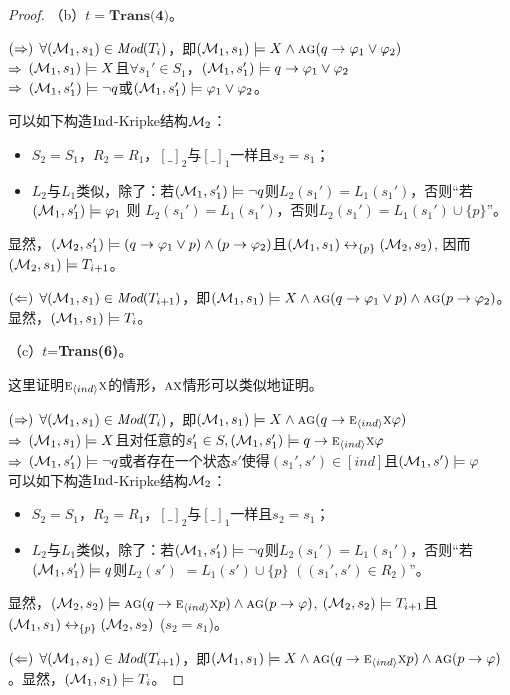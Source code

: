 \begin{proof}
	（b）$t=\textbf{Trans(4)}$。
	
	$(\Rightarrow)$	$\forall({\cal M}_1,s_1) \in \textit{Mod}(T_i)$，即$({\cal M}_1,s_1) \models X \wedge \textsc{a}\textsc{g} (q \rightarrow \varphi_1 \vee \varphi_2)$ \\
	$\Rightarrow$ $({\cal M}_1,s_1) \models X$且$\forall s_1'\in S_1$，$({\cal M}_1, s_1') \models q \rightarrow \varphi_1 \vee \varphi_2$\\
	$\Rightarrow$ $({\cal M}_1,s_1')\models \neg q$或$({\cal M}_1,s_1')\models \varphi_1 \vee \varphi_2$。
	
	可以如下构造$\textrm{Ind}$-Kripke结构${\cal M}_2$：
	\begin{itemize}
		\item $S_2=S_1$，$R_2=R_1$，$[\_]_2$与$[\_]_1$一样且$s_2=s_1$；
		\item $L_2$与$L_1$类似，除了：若$({\cal M}_1, s_1') \models \neg q$则$L_2(s_1') = L_1(s_1')$，否则“若$({\cal M}_1,s_1') \models \varphi_1$ 则 $L_2(s_1')=L_1(s_1')$，否则$L_2(s_1')=L_1(s_1') \cup \{p\}$”。
	\end{itemize}
	显然，$({\cal M}_2,s_1') \models (q\rightarrow \varphi_1 \vee p) \wedge (p \rightarrow \varphi_2)$且$({\cal M}_1, s_1) \leftrightarrow_{\{p\}} ({\cal M}_2, s_2)$, 因而$({\cal M}_2,s_1) \models T_{i+1}$。
	
	$(\Leftarrow)$  $\forall ({\cal M}_1, s_1) \in \textit{Mod}(T_{i+1})$，即$({\cal M}_1,s_1) \models X \wedge \textsc{a}\textsc{g} (q\rightarrow \varphi_1 \vee p) \wedge \textsc{a}\textsc{g}(p \rightarrow \varphi_2)$。 显然，$({\cal M}_1, s_1) \models T_i$。
	
	（c）$t$=\textbf{Trans(6)}。
	
	这里证明$\textsc{e}_{{\langle{ind}\rangle}} \textsc{x}$的情形，$\textsc{a} \textsc{x}$情形可以类似地证明。
	
	$(\Rightarrow)$ $\forall({\cal M}_1,s_1) \in \textit{Mod}(T_i)$，即$({\cal M}_1,s_1) \models X \wedge \textsc{a}\textsc{g}(q \rightarrow \textsc{e}_{{\langle{ind}\rangle}}\textsc{x} \varphi)$\\
	$\Rightarrow$ $({\cal M}_1,s_1) \models X$且对任意的$s_1'\in S, ({\cal M}_1,s_1') \models q \rightarrow \textsc{e}_{{\langle{ind}\rangle}} \textsc{x} \varphi$\\
	$\Rightarrow$ $({\cal M}_1,s_1') \models \neg q$或者存在一个状态$s'$使得$(s_1', s') \in [ind]$且$({\cal M}_1,s') \models \varphi$\\
	
	可以如下构造$\textrm{Ind}$-Kripke结构${\cal M}_2$：
	\begin{itemize}
		\item $S_2=S_1$，$R_2=R_1$，$[\_]_2$与$[\_]_1$一样且$s_2=s_1$；
		\item $L_2$与$L_1$类似，除了：若$({\cal M}_1, s_1') \models \neg q$则$L_2(s_1') = L_1(s_1')$，否则“若$({\cal M}_1,s_1') \models q$则$L_2(s')$ $=L_1(s')\cup \{p\}$ $((s_1',s')\in R_2)$”。
	\end{itemize}
	显然，$({\cal M}_2,s_2) \models \textsc{a}\textsc{g}(q\rightarrow \textsc{e}_{{\langle{ind}\rangle}} \textsc{x} p) \wedge \textsc{a}\textsc{g}(p \rightarrow \varphi)$, $({\cal M}_2,s_2) \models T_{i+1}$且$({\cal M}_1, s_1) \leftrightarrow_{\{p\}} ({\cal M}_2, s_2)$ ($s_2=s_1$)。
	
	$(\Leftarrow)$ $\forall({\cal M}_1, s_1) \in \textit{Mod}(T_{i+1})$，即$({\cal M}_1,s_1) \models X \wedge \textsc{a}\textsc{g}(q\rightarrow \textsc{e}_{{\langle{ind}\rangle}} \textsc{x} p) \wedge \textsc{a}\textsc{g}(p \rightarrow \varphi)$。显然，$({\cal M}_1, s_1) \models T_i$。
\end{proof}

